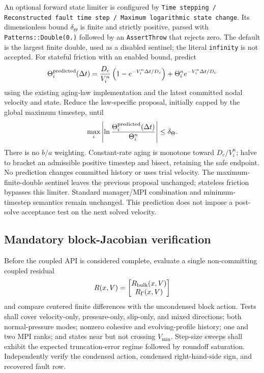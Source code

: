 \documentclass[11pt]{article}
\newcommand{\R}{\mathbb{R}}
\begin{document}
An optional forward state limiter is configured by
\texttt{Time stepping / Reconstructed fault time step / Maximum logarithmic state change}.
Its dimensionless bound $\delta_\Theta$ is finite and strictly positive, parsed
with \texttt{Patterns::Double(0.)} followed by an \texttt{AssertThrow} that
rejects zero. The default is the largest finite double, used
as a disabled sentinel; the literal \texttt{infinity} is not accepted.
For stateful friction with an enabled bound, predict
\[
 \Theta_i^{\rm predicted}(\Delta t)=
 \frac{D_c}{V_i^n}\left(1-e^{-V_i^n\Delta t/D_c}\right)
 +\Theta_i^n e^{-V_i^n\Delta t/D_c}
\]
using the existing aging-law implementation and the latest committed nodal
velocity and state. Reduce the law-specific proposal, initially capped by the
global maximum timestep, until
\[
 \max_i\left|\ln\frac{\Theta_i^{\rm predicted}(\Delta t)}{\Theta_i^n}\right|
 \leq\delta_\Theta.
\]
There is no $b/a$ weighting. Constant-rate aging is monotone toward $D_c/V_i^n$;
halve to bracket an admissible positive timestep and bisect, retaining the safe
endpoint. No prediction changes committed history or uses trial velocity.
The maximum-finite-double sentinel leaves the previous proposal unchanged;
stateless friction bypasses this limiter. Standard manager/MPI combination and minimum-timestep semantics
remain unchanged. This prediction does not impose a post-solve acceptance test
on the next solved velocity.

\subsection{Mandatory block-Jacobian verification}

Before the coupled API is considered complete, evaluate a single
non-committing coupled residual
\begin{equation}
 R(x,V)=\begin{bmatrix}R_{\rm bulk}(x,V)\\R_\Gamma(x,V)\end{bmatrix}
\end{equation}
and compare centered finite differences with the uncondensed block action.
Tests shall cover velocity-only, pressure-only, slip-only, and mixed
directions; both normal-pressure modes; nonzero cohesive and evolving-profile
history; one and two MPI ranks; and states near but not crossing $V_{\min}$.
Step-size sweeps shall exhibit the expected truncation-error regime followed
by roundoff saturation.  Independently verify the condensed action, condensed
right-hand-side sign, and recovered fault row.
\end{document}
